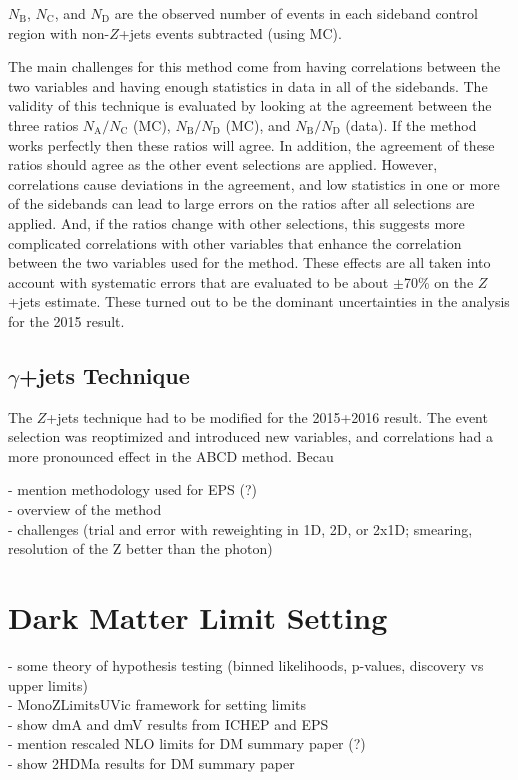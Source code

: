 \noindent $N_\text{B}$, $N_\text{C}$, and $N_\text{D}$ are the observed number of events in each sideband control region with non-$Z$+jets events subtracted (using MC).

The main challenges for this method come from having correlations between the two variables and having enough statistics in data in all of the sidebands. The validity of this technique is evaluated by looking at the agreement between the three ratios $N_\text{A}/N_\text{C}$ (MC), $N_\text{B}/N_\text{D}$ (MC), and $N_\text{B}/N_\text{D}$ (data). If the method works perfectly then these ratios will agree. In addition, the agreement of these ratios should agree as the other event selections are applied. However, correlations cause deviations in the agreement, and low statistics in one or more of the sidebands can lead to large errors on the ratios after all selections are applied. And, if the ratios change with other selections, this suggests more complicated correlations with other variables that enhance the correlation between the two variables used for the method. These effects are all taken into account with systematic errors that are evaluated to be about $\pm$70\% on the $Z$+jets estimate. These turned out to be the dominant uncertainties in the analysis for the 2015 result.

\subsection{$\gamma$+jets Technique}

The $Z$+jets technique had to be modified for the 2015+2016 result. The event selection was reoptimized and introduced new variables, and correlations had a more pronounced effect in the ABCD method. Becau

- mention methodology used for EPS (?)\\
- overview of the method\\
- challenges (trial and error with reweighting in 1D, 2D, or 2x1D; smearing, resolution of the Z better than the photon)\\

\section{Dark Matter Limit Setting}
\label{sec:limits}

- some theory of hypothesis testing (binned likelihoods, p-values, discovery vs upper limits)\\
- MonoZLimitsUVic framework for setting limits\\
- show dmA and dmV results from ICHEP and EPS\\
- mention rescaled NLO limits for DM summary paper (?)\\
- show 2HDMa results for DM summary paper\\

